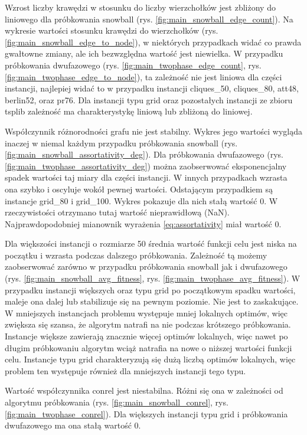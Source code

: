 

Wzrost liczby krawędzi w stosunku do liczby wierzchołków jest zbliżony do liniowego dla próbkowania snowball (rys. \ref{fig:main_snowball_edge_count}).
Na wykresie wartości stosunku krawędzi do wierzchołków (rys. \ref{fig:main_snowball_edge_to_node}), w niektórych przypadkach widać co prawda gwałtowne zmiany, ale
ich bezwzględna wartość jest niewielka.
W przypadku próbkowania dwufazowego (rys. \ref{fig:main_twophase_edge_count}, rys.\ref{fig:main_twophase_edge_to_node}), ta zależność nie jest liniowa dla części instancji,
najlepiej widać to w przypadku instancji cliques\_50, cliques\_80, att48, berlin52, oraz pr76.
Dla instancji typu grid oraz pozostałych instancji ze zbioru tsplib zależność ma charakterystykę liniową lub zbliżoną do liniowej.

Współczynnik różnorodności grafu nie jest stabilny. Wykres jego wartości wygląda inaczej w niemal każdym przypadku
próbkowania snowball (rys. \ref{fig:main_snowball_assortativity_deg}).
Dla próbkowania dwufazowego (rys. \ref{fig:main_twophase_assortativity_deg}) można zaobserwować eksponencjalny spadek wartości taj miary dla części instancji.
W innych przypadkach wzrasta ona szybko i oscyluje wokół pewnej wartości.
Odstającym przypadkiem są instancje grid\_80 i grid\_100. Wykres pokazuje dla nich stałą wartość 0.
W rzeczywistości otrzymano tutaj wartość nieprawidłową (NaN). Najprawdopodobniej mianownik wyrażenia \ref{eq:assortativity}
miał wartość 0.

Dla większości instancji o rozmiarze 50 średnia wartość funkcji celu jest niska na początku i wzrasta podczas dalszego próbkowania.
Zależność tą możemy zaobserwować zarówno w przypadku próbkowania snowball jak i dwufazowego (rys. \ref{fig:main_snowball_avg_fitness}, rys. \ref{fig:main_twophase_avg_fitness}).
W przypadku instancji większych oraz typu grid po początkowym spadku wartości, maleje ona dalej lub stabilizuje się na pewnym poziomie.
Nie jest to zaskakujące. W mniejszych instancjach problemu występuje mniej lokalnych optimów, więc zwiększa się szansa, że algorytm
natrafi na nie podczas krótszego próbkowania. Instancje większe zawierają znacznie więcej optimów lokalnych, więc nawet po długim próbkowaniu
algorytm wciąż natrafia na nowe o niższej wartości funkcji celu. Instancje typu grid charakteryzują się dużą liczbą optimów lokalnych,
więc problem ten występuje również dla mniejszych instancji tego typu.

Wartość współczynnika conrel jest niestabilna. Różni się ona w zależności od algorytmu próbkowania (rys. \ref{fig:main_snowball_conrel}, rys. \ref{fig:main_twophase_conrel}).
Dla większych instancji typu grid i próbkowania dwufazowego ma ona stałą wartość 0.

